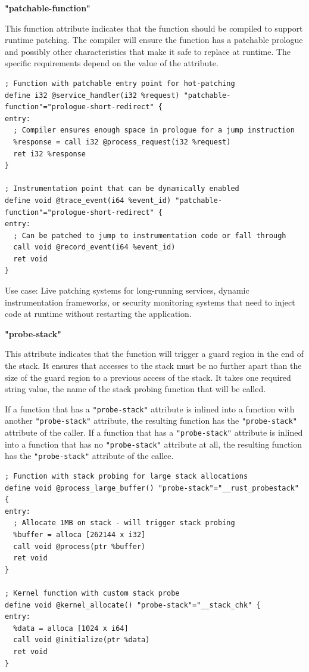 \textbf{"patchable-function"}

This function attribute indicates that the function should be compiled to support runtime patching.
The compiler will ensure the function has a patchable prologue and possibly other characteristics that make it safe to replace at runtime.
The specific requirements depend on the value of the attribute.

\begin{lstlisting}[style=ir]
; Function with patchable entry point for hot-patching
define i32 @service_handler(i32 %request) "patchable-function"="prologue-short-redirect" {
entry:
  ; Compiler ensures enough space in prologue for a jump instruction
  %response = call i32 @process_request(i32 %request)
  ret i32 %response
}

; Instrumentation point that can be dynamically enabled
define void @trace_event(i64 %event_id) "patchable-function"="prologue-short-redirect" {
entry:
  ; Can be patched to jump to instrumentation code or fall through
  call void @record_event(i64 %event_id)
  ret void
}
\end{lstlisting}

Use case: Live patching systems for long-running services, dynamic instrumentation frameworks, or security monitoring systems that need to inject code at runtime without restarting the application.

\textbf{"probe-stack"}

This attribute indicates that the function will trigger a guard region in the end of the stack.
It ensures that accesses to the stack must be no further apart than the size of the guard region to a previous access of the stack.
It takes one required string value, the name of the stack probing function that will be called.

If a function that has a \texttt{"probe-stack"} attribute is inlined into a function with another \texttt{"probe-stack"} attribute, the resulting function has the \texttt{"probe-stack"} attribute of the caller.
If a function that has a \texttt{"probe-stack"} attribute is inlined into a function that has no \texttt{"probe-stack"} attribute at all, the resulting function has the \texttt{"probe-stack"} attribute of the callee.

\begin{lstlisting}[style=ir]
; Function with stack probing for large stack allocations
define void @process_large_buffer() "probe-stack"="__rust_probestack" {
entry:
  ; Allocate 1MB on stack - will trigger stack probing
  %buffer = alloca [262144 x i32]
  call void @process(ptr %buffer)
  ret void
}

; Kernel function with custom stack probe
define void @kernel_allocate() "probe-stack"="__stack_chk" {
entry:
  %data = alloca [1024 x i64]
  call void @initialize(ptr %data)
  ret void
}
\end{lstlisting}

